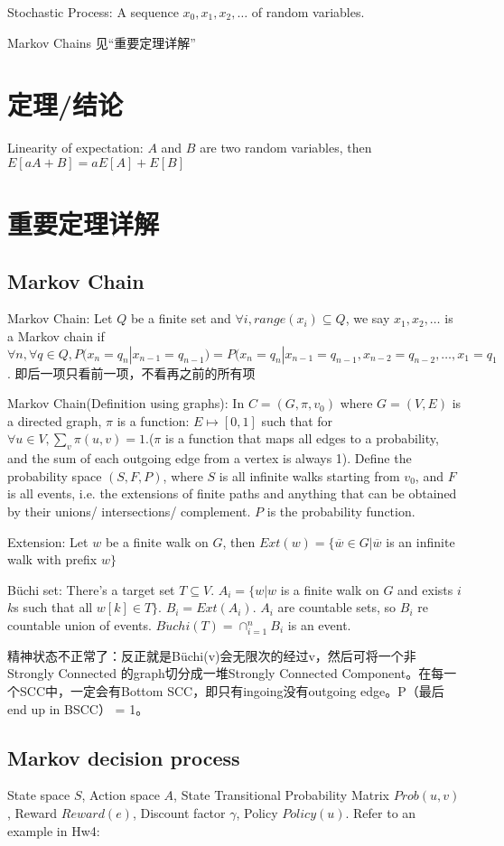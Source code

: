 \documentclass[12pt,a4paper]{ctexrep}
\begin{document}
Stochastic Process: A sequence $x_0,x_1,x_2,\dots$ of random variables.

Markov Chains 见“重要定理详解”
\section{定理/结论}
Linearity of expectation: $A$ and $B$ are two random variables, then $E[aA+B] = aE[A]+E[B]$
\section{重要定理详解}
\subsection{Markov Chain}
Markov Chain: Let $Q$ be a finite set and $\forall i, range(x_i) \subseteq Q$, we say $x_1,x_2,\dots$ is a Markov chain if $\forall n, \forall q \in Q, P(x_n = q_n|x_{n-1} = q_{n-1}) = P(x_n = q_n|x_{n-1} = q_{n-1},x_{n-2} = q_{n-2},\dots,x_{1} = q_{1}$. 即后一项只看前一项，不看再之前的所有项

Markov Chain(Definition using graphs): In $C = (G,\pi,v_0)$ where $G = (V,E)$ is a directed graph, $\pi$ is a function: $E\mapsto [0,1]$ such that for $\forall u \in V, \sum_{v} \pi(u,v) = 1$.($\pi$ is a function that maps all edges to a probability, and the sum of each outgoing edge from a vertex is always 1). Define the probability space $(S,F,P)$, where $S$ is all infinite walks starting from $v_0$, and $F$ is all events, i.e. the extensions of finite paths and anything that can be obtained by their unions/ intersections/ complement. $P$ is the probability function.

Extension: Let $w$ be a finite walk on $G$, then $Ext(w) = \{\overline{w} \in G| \overline{w}$ is an infinite walk with prefix $w\}$

B\"uchi set: There's a target set $T\subseteq V$. $A_i = \{w|w$ is a finite walk on $G$ and exists $i$ $k$s such that all $w[k] \in T\}$. $B_i = Ext(A_i)$. $A_i$ are countable sets, so $B_i$ re countable union of events. $B\ddot{u}chi(T) = \cap_{i=1}^n B_i$ is an event.

精神状态不正常了：反正就是B\"uchi(v)会无限次的经过v，然后可将一个非Strongly Connected 的graph切分成一堆Strongly Connected Component。在每一个SCC中，一定会有Bottom SCC，即只有ingoing没有outgoing edge。P（最后end up in BSCC） = 1。

\subsection{Markov decision process}
State space $S$, Action space $A$, State Transitional Probability Matrix $Prob(u,v)$, Reward $Reward(e)$, Discount factor $\gamma$, Policy $Policy(u)$. Refer to an example in Hw4: 
\end{document}
